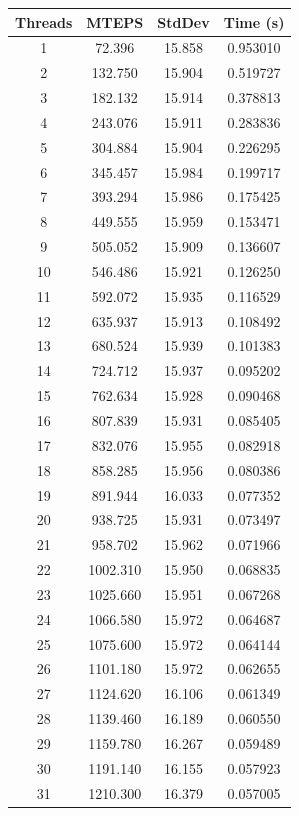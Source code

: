 \documentclass[10pt,twocolumn,letterpaper]{article}
\begin{document}
\begin{table}[h]
\renewcommand\arraystretch{0.8}
\centering
\begin{tabular}{@{}c|ccc@{}}
\toprule
Threads          & MTEPS  & StdDev     & Time (s)      \\ \midrule
1 & 72.396 & 15.858 & 0.953010 \\
2 & 132.750 & 15.904 & 0.519727 \\
3 & 182.132 & 15.914 & 0.378813 \\
4 & 243.076 & 15.911 & 0.283836 \\
5 & 304.884 & 15.904 & 0.226295 \\
6 & 345.457 & 15.984 & 0.199717 \\
7 & 393.294 & 15.986 & 0.175425 \\
8 & 449.555 & 15.959 & 0.153471 \\
9 & 505.052 & 15.909 & 0.136607 \\
10 & 546.486 & 15.921 & 0.126250 \\
11 & 592.072 & 15.935 & 0.116529 \\
12 & 635.937 & 15.913 & 0.108492 \\
13 & 680.524 & 15.939 & 0.101383 \\
14 & 724.712 & 15.937 & 0.095202 \\
15 & 762.634 & 15.928 & 0.090468 \\
16 & 807.839 & 15.931 & 0.085405 \\
17 & 832.076 & 15.955 & 0.082918 \\
18 & 858.285 & 15.956 & 0.080386 \\
19 & 891.944 & 16.033 & 0.077352 \\
20 & 938.725 & 15.931 & 0.073497 \\
21 & 958.702 & 15.962 & 0.071966 \\
22 & 1002.310 & 15.950 & 0.068835 \\
23 & 1025.660 & 15.951 & 0.067268 \\
24 & 1066.580 & 15.972 & 0.064687 \\
25 & 1075.600 & 15.972 & 0.064144 \\
26 & 1101.180 & 15.972 & 0.062655 \\
27 & 1124.620 & 16.106 & 0.061349 \\
28 & 1139.460 & 16.189 & 0.060550 \\
29 & 1159.780 & 16.267 & 0.059489 \\
30 & 1191.140 & 16.155 & 0.057923 \\
31 & 1210.300 & 16.379 & 0.057005 \\

\end{tabular}
\end{table}
\end{document}
